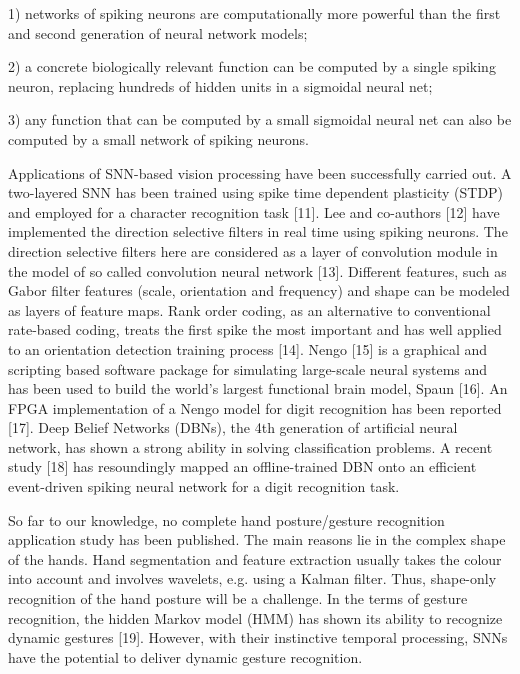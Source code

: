 1) networks of spiking neurons are computationally more powerful than the first and second generation of neural network models;

2) a concrete biologically relevant function can be computed by a single spiking neuron, replacing  hundreds of hidden units in a sigmoidal neural net;

3) any function that can be computed by a small sigmoidal neural net can also be computed by a small network of spiking neurons.

Applications of SNN-based vision processing have been successfully carried out. 
A two-layered SNN has been trained using spike time dependent plasticity (STDP) and employed for a character recognition task [11]. 
Lee and co-authors [12] have implemented the direction selective filters in real time using spiking neurons. 
The direction selective filters here are considered as a layer of convolution module in the model of so called convolution neural network [13]. 
Different features, such as Gabor filter features (scale, orientation and frequency) and shape can be modeled as layers of feature maps. 
Rank order coding, as an alternative to conventional rate-based coding, treats the first spike the most important and has well applied to an orientation detection training process [14]. 
Nengo [15] is a graphical and scripting based software package for simulating large-scale neural systems and has been used to build the world's largest functional brain model, Spaun [16]. 
An FPGA implementation of a Nengo model for digit recognition has been reported [17]. 
Deep Belief Networks (DBNs), the 4th generation of artificial neural network, has shown a strong ability in solving classification problems. 
A recent study [18] has resoundingly mapped an offline-trained DBN onto an efficient event-driven spiking neural network for a digit recognition task. 

So far to our knowledge, no complete hand posture/gesture recognition application study has been published. The main reasons lie in the complex shape of the hands. 
Hand segmentation and feature extraction usually takes the colour into account and involves wavelets, e.g. using a Kalman filter. 
Thus, shape-only recognition of the hand posture will be a challenge. 
In the terms of gesture recognition, the hidden Markov model (HMM) has shown its ability to recognize dynamic gestures [19]. 
However, with their instinctive temporal processing, SNNs have the potential to deliver dynamic gesture recognition.




